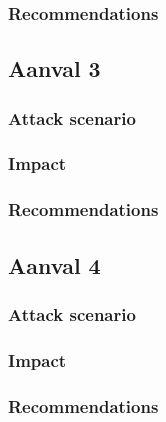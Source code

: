 \subsubsection{
{Recommendations}}
\label{sec:Aanbevelingen}

\subsection{
{Aanval 3}}
\label{sec:Aanval 3}

\subsubsection{
{Attack scenario}}
\label{sec:Aanval scenario}

\subsubsection{
{Impact}}
\label{sec:Impact}

\subsubsection{
{Recommendations}}
\label{sec:Aanbevelingen}

\subsection{
{Aanval 4}}
\label{sec:Aanval 4}

\subsubsection{
{Attack scenario}}
\label{sec:Aanval scenario}

\subsubsection{
{Impact}}
\label{sec:Impact}


\subsubsection{
{Recommendations}}
\label{sec:Aanbevelingen}



